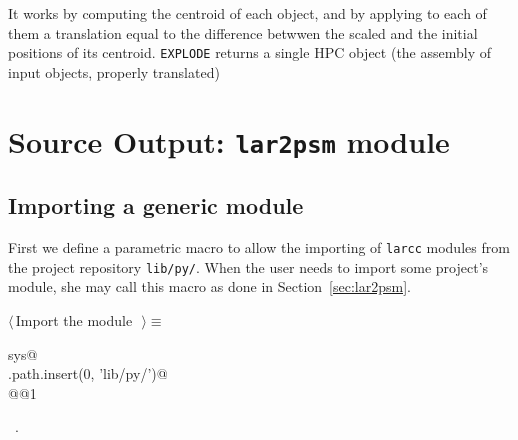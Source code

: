 \documentclass[11pt,oneside]{article}	%
\begin{document}
It works by computing the centroid of each object, and by applying to each of them a translation equal to the difference betwwen the scaled and the initial positions of its centroid. 
\texttt{EXPLODE}  returns a single HPC object (the assembly of input objects, properly translated)

\section{Source Output: \texttt{lar2psm} module}


\subsection{Importing a generic module}
First we define a parametric macro to allow the importing of \texttt{larcc} modules from the project repository \texttt{lib/py/}. When the user needs to import some project's module, she may call this macro as done in Section~\ref{sec:lar2psm}.
\begin{flushleft} \small
\begin{minipage}{\linewidth} \label{scrap12}
$\langle\,$Import the module\nobreak\ {\footnotesize {}}$\,\rangle\equiv$
\vspace{-1ex}
\begin{list}{}{} \item
\mbox{}\verb@import sys@\\
\mbox{}\verb@sys.path.insert(0, 'lib/py/')@\\
\mbox{}\verb@import @@1\verb@@\\
\mbox{}\verb@@{\NWsep}
\end{list}
\vspace{-1ex}
\footnotesize\addtolength{\baselineskip}{-1ex}
\begin{list}{}{\setlength{\itemsep}{-\parsep}\setlength{\itemindent}{-\leftmargin}}
\item \NWtxtMacroRefIn\ .
\end{list}
\end{minipage}\\[4ex]
\end{flushleft}
\end{document}
